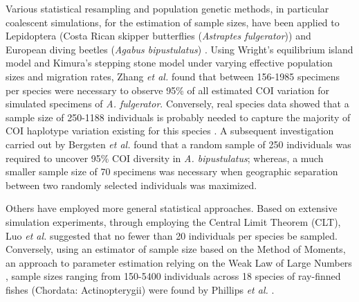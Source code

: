 Various statistical resampling and population genetic methods, in particular coalescent simulations, for the estimation of sample sizes, have been applied to Lepidoptera (Costa Rican skipper butterflies (\textit{Astraptes fulgerator})) \cite{zhang2010estimating} and European diving beetles (\textit{Agabus bipustulatus}) \cite{bergsten2012effect}. Using Wright's equilibrium island model \cite{wright1951genetical} and Kimura's stepping stone model \cite{kimura1964stepping} under varying effective population sizes and migration rates, Zhang \textit{et al.} \cite{zhang2010estimating} found that between 156-1985 specimens per species were necessary to observe 95\% of all estimated COI variation for simulated specimens of \textit{A. fulgerator}. Conversely, real species data showed that a sample size of 250-1188 individuals is probably needed to capture the majority of COI haplotype variation existing for this species \cite{zhang2010estimating}. A subsequent investigation carried out by Bergsten \textit{et al.} \cite{bergsten2012effect} found that a random sample of 250 individuals was required to uncover 95\% COI diversity in \textit{A. bipustulatus}; whereas, a much smaller sample size of 70 specimens was necessary when geographic separation between two randomly selected individuals was maximized.

 

Others have employed more general statistical approaches. Based on extensive \\ simulation experiments, through employing the Central Limit Theorem (CLT), Luo \textit{et al.} \cite{luo2015simulation} suggested that no fewer than 20 individuals per species be sampled. Conversely, using an estimator of sample size based on the Method of Moments, an approach to parameter estimation relying on the Weak Law of Large Numbers \cite{pearson1894contributions}, sample sizes ranging from 150-5400 individuals across 18 species of ray-finned fishes (Chordata: Actinopterygii) were found by Phillips \textit{et al.} \cite{phillips2015exploration}.



